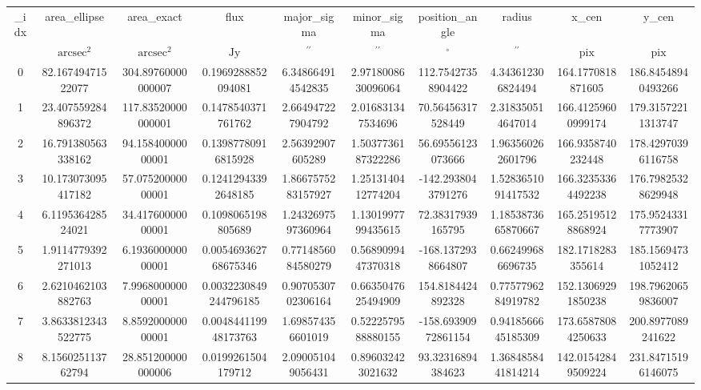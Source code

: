 \begin{table}
\begin{tabular}{cccccccccc}
_idx & area_ellipse & area_exact & flux & major_sigma & minor_sigma & position_angle & radius & x_cen & y_cen \\
 & $\mathrm{arcsec^{2}}$ & $\mathrm{arcsec^{2}}$ & $\mathrm{Jy}$ & $\mathrm{{}^{\prime\prime}}$ & $\mathrm{{}^{\prime\prime}}$ & $\mathrm{{}^{\circ}}$ & $\mathrm{{}^{\prime\prime}}$ & $\mathrm{pix}$ & $\mathrm{pix}$ \\
0 & 82.16749471522077 & 304.89760000000007 & 0.1969288852094081 & 6.348664914542835 & 2.9718008630096064 & 112.75427358904422 & 4.343612306824494 & 164.1770818871605 & 186.84548940493266 \\
1 & 23.407559284896372 & 117.83520000000001 & 0.1478540371761762 & 2.664947227904792 & 2.016831347534696 & 70.56456317528449 & 2.318350514647014 & 166.41259600999174 & 179.31572211313747 \\
2 & 16.791380563338162 & 94.15840000000001 & 0.13987780916815928 & 2.56392907605289 & 1.5037736187322286 & 56.69556123073666 & 1.963560262601796 & 166.9358740232448 & 178.42970396116758 \\
3 & 10.173073095417182 & 57.07520000000001 & 0.12412943392648185 & 1.8667575283157927 & 1.2513140412774204 & -142.2938043791276 & 1.5283651091417532 & 166.32353364492238 & 176.79825328629948 \\
4 & 6.119536428524021 & 34.41760000000001 & 0.1098065198805689 & 1.2432697597360964 & 1.1301997799435615 & 72.38317939165795 & 1.1853873665870667 & 165.25195128868924 & 175.95243317773907 \\
5 & 1.9114779392271013 & 6.193600000000001 & 0.005469362768675346 & 0.7714856084580279 & 0.5689099447370318 & -168.1372938664807 & 0.662499686696735 & 182.1718283355614 & 185.15694731052412 \\
6 & 2.6210462103882763 & 7.996800000000001 & 0.0032230849244796185 & 0.9070530702306164 & 0.6635047625494909 & 154.8184424892328 & 0.7757796284919782 & 152.13069291850238 & 198.79620659836007 \\
7 & 3.8633812343522775 & 8.859200000000001 & 0.004844119948173763 & 1.698574356601019 & 0.5222579588880155 & -158.69390972861154 & 0.9418566645185309 & 173.65878084250633 & 200.8977089241622 \\
8 & 8.156025113762794 & 28.851200000000006 & 0.0199261504179712 & 2.090051049056431 & 0.896032423021632 & 93.32316894384623 & 1.3684858441814214 & 142.01542849509224 & 231.84715196146075 \\

\end{tabular}
\end{table}
